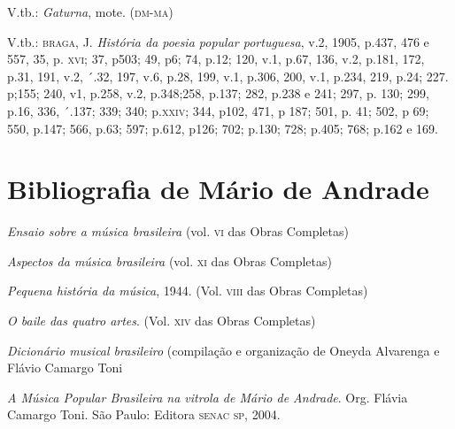V.tb.: \textit{Gaturna}, mote. (\textsc{dm-ma})

V.tb.: \textsc{braga}, J. \textit{História da poesia popular portuguesa}, v.2,
1905, p.437, 476 e 557, 35, p. \textsc{xvi}; 37, p503; 49, p6; 74, p.12; 120,
v.1, p.67, 136, v.2, p.181, 172, p.31, 191, v.2, ´.32, 197, v.6, p.28,
199, v.1, p.306, 200, v.1, p.234, 219, p.24; 227. p;155; 240, v1, p.258,
v.2, p.348;258, p.137; 282, p.238 e 241; 297, p. 130; 299, p.16, 336,
´.137; 339; 340; p.\textsc{xxiv}; 344, p102, 471, p 187; 501, p. 41; 502, p 69;
550, p.147; 566, p.63; 597; p.612, p126; 702; p.130; 728; p.405; 768;
p.162 e 169.


\chapter{Bibliografia de Mário de Andrade}

\textit{Ensaio sobre a música brasileira} (vol. \textsc{vi} das Obras Completas)

\textit{Aspectos da música brasileira} (vol. \textsc{xi} das Obras Completas)

\textit{Pequena história da música}, 1944. (Vol. \textsc{viii} das Obras Completas)

\textit{O baile das quatro artes}. (Vol. \textsc{xiv} das Obras Completas)

\textit{Dicionário musical brasileiro} (compilação e organização de Oneyda
Alvarenga e Flávio Camargo Toni

\textit{A Música Popular Brasileira na vitrola de Mário de Andrade}. Org.
Flávia Camargo Toni. São Paulo: Editora \textsc{senac sp}, 2004.

